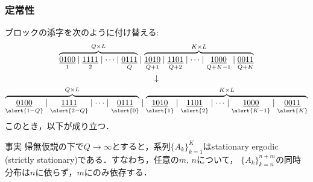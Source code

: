 \documentclass[dvipdfmx,11pt]{beamer}
\begin{document}
\begin{frame}[c]\frametitle{定常性}
ブロックの添字を次のように付け替える:
\begin{gather*}
  \overbrace{\underset{1}{\underline{0100}}\mid\underset{2}{\underline{1111}}\mid\cdots\mid\underset{Q}{\underline{0111}}}^{Q\times L} \mid \overbrace{\underset{Q+1}{\underline{1010}}\mid\underset{Q+2}{\underline{1101}}\mid\cdots\mid\underset{Q+K-1}{\underline{1000}}\mid\underset{Q+K}{\underline{0011}}}^{K\times L} \\
  \downarrow \\
  \overbrace{\underset{\alert{1-Q}}{\underline{0100}}\mid\underset{\alert{2-Q}}{\underline{1111}}\mid\cdots\mid\underset{\alert{0}}{\underline{0111}}}^{Q\times L} \mid \overbrace{\underset{\alert{1}}{\underline{1010}}\mid\underset{\alert{2}}{\underline{1101}}\mid\cdots\mid\underset{\alert{K-1}}{\underline{1000}}\mid\underset{\alert{K}}{\underline{0011}}}^{K\times L}
\end{gather*}
%
\vspace{.5\baselineskip}
このとき，以下が成り立つ．
\begin{exampleblock}{事実}
帰無仮説の下で$Q\to\infty$とすると，系列$\{A_k\}_{k=1}^{K}$は\alert{stationary ergodic (strictly stationary)}である．すなわち，任意の$m,\,n$について，
$\{A_k\}_{k=n}^{n+m}$の同時分布は$n$に依らず，$m$にのみ依存する．
\end{exampleblock}
\end{frame}
\end{document}
